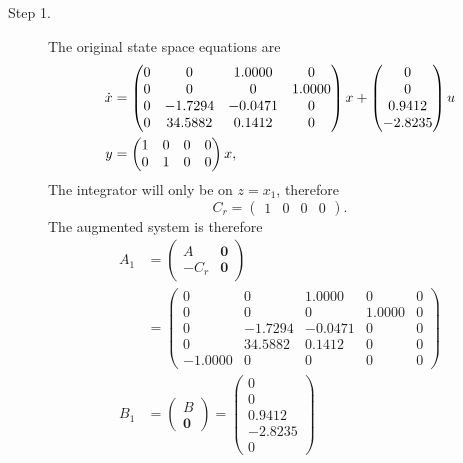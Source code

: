 
\begin{description}
\item[Step 1.]
The original state space equations are 
\begin{align}
	\dot{x} &= \begin{pmatrix}
		0 &        0 &   1.0000 &        0 \\
		0 &        0 &        0 &   1.0000 \\
		0 &  -1.7294 &   -0.0471 &        0 \\
		0 &  34.5882 &   0.1412 &        0 \\
	\end{pmatrix} x + \begin{pmatrix}
		0 \\
		0 \\
		0.9412 \\
		-2.8235 \\
	\end{pmatrix} u \notag \\
	y &= \begin{pmatrix}
		1 & 0 & 0 & 0 \\
		0 & 1 & 0 & 0 
	\end{pmatrix} x, \label{eq:hw_state_feedback_b1_1}
\end{align}
The integrator will only be on $z=x_1$, therefore 
\[
C_r = \begin{pmatrix} 1 & 0 & 0 & 0 \end{pmatrix}.
\]
The augmented system is therefore
\begin{align*}
A_1 &= \begin{pmatrix} A & \mathbf{0} \\ -C_r & \mathbf{0} \end{pmatrix} \\ &= \begin{pmatrix} 
         0 &        0 &   1.0000 &        0  &       0 \\
         0 &        0 &        0 &   1.0000  &       0 \\ 
         0 &  -1.7294 &  -0.0471 &        0  &       0 \\
         0 &  34.5882 &    0.1412 &        0  &       0 \\
    -1.0000 &        0 &        0 &        0  &       0
\end{pmatrix} \\
B_1 &= \begin{pmatrix} B \\ \mathbf{0} \end{pmatrix} = \begin{pmatrix} 
0   \\      0  \\  0.9412 \\  -2.8235   \\      0 
\end{pmatrix}
\end{align*}


\end{description}
